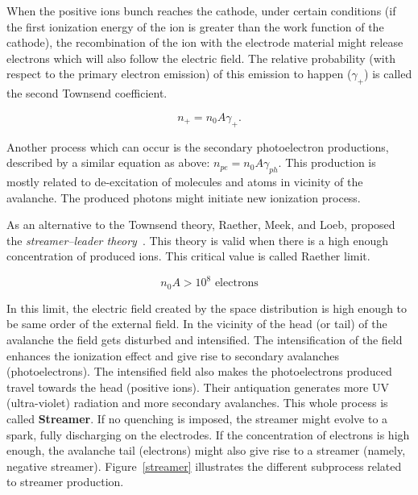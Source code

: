 When the positive ions bunch reaches the cathode, under certain conditions (if the first ionization energy of the ion is greater than the work function of the cathode), the recombination of the ion with the electrode material might release electrons which will also follow the electric field. The relative probability (with respect to the primary electron emission) of this emission to happen ($\gamma_{+}$) is called the second Townsend coefficient.
 
\begin{equation}
    n_{+}=n_{0} A \gamma_{+}.
\end{equation}

Another process which can occur is the secondary photoelectron productions, described by a similar equation as above: $n_{pe}=n_{0} A \gamma_{ph}$. This production is mostly related to de-excitation of molecules and atoms in vicinity of the avalanche. The produced photons might initiate new ionization process.

As an alternative to the Townsend theory, Raether, Meek, and Loeb, proposed the \textit{streamer–leader theory}~\cite{streamer_leader_theory}. This theory is valid when there is a high enough concentration of produced ions. This critical value is called Raether limit.

\begin{equation}
    n_{0} A > 10^{8} \text{ electrons}
\end{equation}

In this limit, the electric field created by the space distribution is high enough to be same order of the external field. In the vicinity of the head (or tail) of the avalanche the field gets disturbed and intensified. The intensification of the field enhances the ionization effect and give rise to secondary avalanches (photoelectrons). The intensified field also makes the photoelectrons produced travel towards the head (positive ions). Their antiquation generates more UV (ultra-violet) radiation and more secondary avalanches. This whole process is called \textbf{Streamer}. If no quenching is imposed, the streamer might evolve to a spark, fully discharging on the electrodes. If the concentration of electrons is high enough, the avalanche tail (electrons) might also give rise to a streamer (namely, negative streamer). Figure~\ref{streamer} illustrates the different subprocess related to streamer production.

